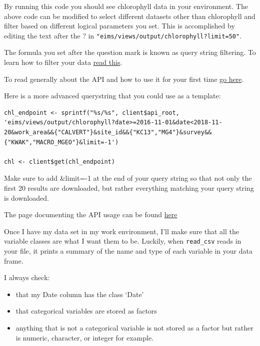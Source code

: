 \documentclass[]{book}
\providecommand{\tightlist}{%
  \setlength{\itemsep}{0pt}\setlength{\parskip}{0pt}}
\begin{document}
By running this code you should see chlorophyll data in your
environment. The above code can be modified to select different datasets
other than chlorophyll and filter based on different logical parameters
you set. This is accomplished by editing the text after the ? in
\texttt{"eims/views/output/chlorophyll?limit=50"}.

The formula you set after the question mark is known as query string
filtering. To learn how to filter your data
\href{https://github.com/HakaiInstitute/hakai-api/blob/master/docs/querying-data.md}{read
this}.

To read generally about the API and how to use it for your first time
\href{https://github.com/HakaiInstitute/hakai-api/blob/master/docs/simplified-api-documentation.md\#what-is-the-hakai-api}{go
here}.

Here is a more advanced querystring that you could use as a template:

\begin{verbatim}
chl_endpoint <- sprintf("%s/%s", client$api_root, 'eims/views/output/chlorophyll?date>=2016-11-01&date<2018-11-20&work_area&&{"CALVERT"}&site_id&&{"KC13","MG4"}&survey&&{"KWAK","MACRO_MGEO"}&limit=-1')

chl <- client$get(chl_endpoint)
\end{verbatim}

Make sure to add \&limit=-1 at the end of your query string so that not
only the first 20 results are downloaded, but rather everything matching
your query string is downloaded.

The page documenting the API usage can be found
\href{https://hakaiinstitute.github.io/hakai-api/}{here}

Once I have my data set in my work environment, I'll make sure that all
the variable classes are what I want them to be. Luckily, when
\texttt{read\_csv} reads in your file, it prints a summary of the name
and type of each variable in your data frame.

I always check:

\begin{itemize}
\tightlist
\item
  that my Date column has the class `Date'
\item
  that categorical variables are stored as factors
\item
  anything that is not a categorical variable is not stored as a factor
  but rather is numeric, character, or integer for example.
\end{itemize}
\end{document}
